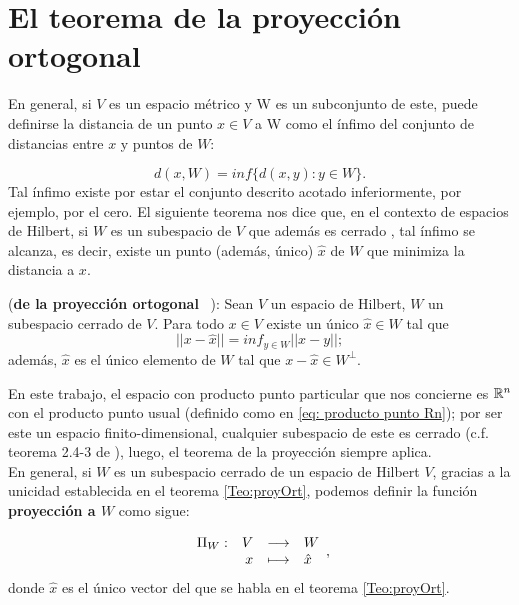 \section{El teorema de la proyección ortogonal}

En general, si $V$ es un espacio métrico y W es un subconjunto
de este, puede definirse la distancia de un punto $x \in V$ a W como
el ínfimo del conjunto de distancias entre $x$ y puntos de $W$:

\[
d(x,W)=inf\{d(x,y): y \in W \}.
\]
\noindent 
Tal ínfimo existe por estar el conjunto descrito acotado inferiormente,
por ejemplo, por el cero. El siguiente teorema nos dice que,
en el contexto de espacios de Hilbert, si $W$ es un subespacio de $V$
que además es cerrado , 
tal ínfimo se alcanza, es decir, existe un punto
(además, único) $\hat{x}$ de $W$ que minimiza la distancia a $x$. \\

\begin{teo} 
\label{Teo:proyOrt}
(\textbf{de la proyección ortogonal}
~\cite{Nimark}):
Sean $V$ un espacio de Hilbert, $W$ un subespacio cerrado de $V$. 
Para todo $x \in V$ existe un único $\hat{x} \in W$ tal que
\[
||x- \hat{x}|| = inf_{y \in W}|| x-y ||;
\]
además, $\hat{x}$ es el único elemento de $W$
tal que $x-\hat{x} \in W^{\perp} $.
\end{teo}


En este trabajo, 
el espacio con producto punto
particular que nos concierne 
es $\mathbb{R}^{n}$ con el producto punto usual
(definido como en \eqref{eq: producto punto Rn}); por ser
este un espacio finito-dimensional, 
cualquier subespacio de este es cerrado
(c.f. teorema 2.4-3 de \cite{Kreyszig}),
luego, el teorema de la proyección siempre aplica. \\

En general, si $W$ es un subespacio cerrado de
un espacio de Hilbert $V$, gracias a la unicidad
establecida en el teorema \ref{Teo:proyOrt},
podemos definir la función \textbf{proyección a $W$}
como sigue:

\begin{equation}
\label{eq3: 1Dic}
\text{${\begin{array}{crcl} \Pi_{W}: & V & \longrightarrow & W \\ \, & x & \longmapsto & \hat{x} \end{array}}$},
\end{equation}
donde $\hat{x}$ es el único vector del que se habla
en el teorema \ref{Teo:proyOrt}.


